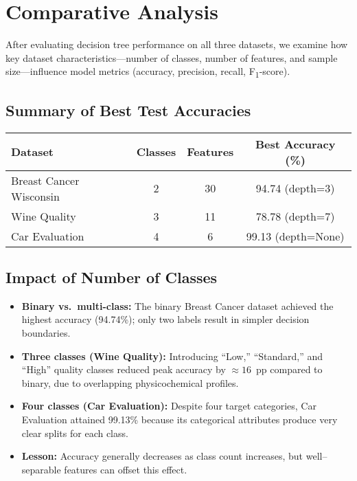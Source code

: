 \pagebreak
\section{Comparative Analysis}

After evaluating decision tree performance on all three datasets, we examine how key dataset characteristics—number of classes, number of features, and sample size—influence model metrics (accuracy, precision, recall, F\textsubscript{1}-score).

\subsection{Summary of Best Test Accuracies}
\begin{center}
	\renewcommand{\arraystretch}{1.2}
	\begin{tabular}{|l|c|c|c|}
		\hline
		\textbf{Dataset}        & \textbf{Classes} & \textbf{Features} & \textbf{Best Accuracy (\%)} \\\hline
		Breast Cancer Wisconsin & 2                & 30                & 94.74 (depth=3)             \\\hline
		Wine Quality            & 3                & 11                & 78.78 (depth=7)             \\\hline
		Car Evaluation          & 4                & 6                 & 99.13 (depth=None)          \\\hline
	\end{tabular}
\end{center}

\subsection{Impact of Number of Classes}
\begin{itemize}
	\item \textbf{Binary vs.\ multi-class:}
	      The binary Breast Cancer dataset achieved the highest accuracy (94.74\%); only two labels result in simpler decision boundaries.
	\item \textbf{Three classes (Wine Quality):}
	      Introducing “Low,” “Standard,” and “High” quality classes reduced peak accuracy by \(\approx16\) pp compared to binary, due to overlapping physicochemical profiles.
	\item \textbf{Four classes (Car Evaluation):}
	      Despite four target categories, Car Evaluation attained 99.13\% because its categorical attributes produce very clear splits for each class.
	\item \textbf{Lesson:}
	      Accuracy generally decreases as class count increases, but well–separable features can offset this effect.
\end{itemize}

